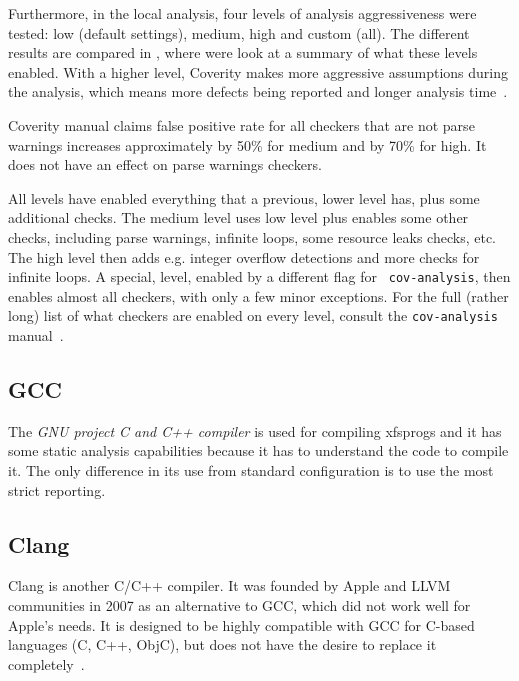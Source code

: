Furthermore, in the local analysis, four levels of analysis aggressiveness were
tested: low (default settings), medium, high and custom (all). The different
results are compared in , where were look at a
summary of what these levels enabled. With a higher level, Coverity makes more
aggressive assumptions during the analysis, which means more defects being
reported and longer analysis time~\cite{coverityMan}.

Coverity manual claims false positive rate for all checkers that are not parse
warnings increases approximately by 50\% for medium and by 70\% for high. It
does not have an effect on parse warnings checkers.

All levels have enabled everything that a previous, lower level has, plus some
additional checks. The medium level uses low level plus enables some other
checks, including parse warnings, infinite loops, some resource leaks checks,
etc. The high level then adds e.g. integer overflow detections and more checks
for infinite loops. A special, level, enabled by a different flag for {\tt
cov-analysis}, then enables almost all checkers, with only a few minor
exceptions. For the full (rather long) list of what checkers are enabled on every
level, consult the {\tt cov-analysis} manual~\cite{coverityMan}.

\subsection{GCC}
The {\em GNU project C and C++ compiler} is used for compiling xfsprogs and it
has some static analysis capabilities because it has to understand the code to
compile it. The only difference in its use from standard configuration is to
use the most strict reporting.

\subsection{Clang}
Clang is another C/C++ compiler. It was founded by Apple and LLVM communities
in 2007 as an alternative to GCC, which did not work well for Apple's needs. It
is designed to be highly compatible with GCC for C-based languages (C, C++,
ObjC), but does not have the desire to replace it
completely~\cite{ClangAnnouncement}.

